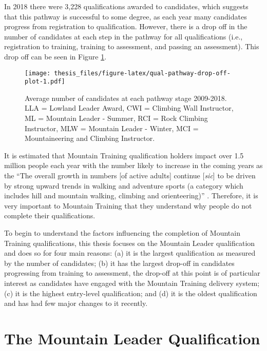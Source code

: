 \documentclass[
  12pt,
  a4paper,
]{book}
\begin{document}
In 2018 there were 3,228 qualifications awarded to candidates, which suggests that this pathway is successful to some degree, as each year many candidates progress from registration to qualification. However, there is a drop off in the number of candidates at each step in the pathway for all qualifications (i.e., registration to training, training to assessment, and passing an assessment). This drop off can be seen in Figure \ref{fig:qual-pathway-drop-off-plot}.

\begin{figure}
\centering
\texttt{[image: thesis\_files/figure-latex/qual-pathway-drop-off-plot-1.pdf]}
\caption{\label{fig:qual-pathway-drop-off-plot}Average number of candidates at each pathway stage 2009-2018. LLA = Lowland Leader Award, CWI = Climbing Wall Instructor, ML = Mountain Leader - Summer, RCI = Rock Climbing Instructor, MLW = Mountain Leader - Winter, MCI = Mountaineering and Climbing Instructor.}
\end{figure}

It is estimated that Mountain Training qualification holders impact over 1.5 million people each year \citep{MTE2019} with the number likely to increase in the coming years as the ``The overall growth in numbers {[}of active adults{]} continue {[}\emph{sic}{]} to be driven by strong upward trends in walking and adventure sports (a category which includes hill and mountain walking, climbing and orienteering)'' \citep[p 14]{SportEngland2020}. Therefore, it is very important to Mountain Training that they understand why people do not complete their qualifications.

To begin to understand the factors influencing the completion of Mountain Training qualifications, this thesis focuses on the Mountain Leader qualification and does so for four main reasons: (a) it is the largest qualification as measured by the number of candidates; (b) it has the largest drop-off in candidates progressing from training to assessment, the drop-off at this point is of particular interest as candidates have engaged with the Mountain Training delivery system; (c) it is the highest entry-level qualification; and (d) it is the oldest qualification and has had few major changes to it recently.

\hypertarget{the-mountain-leader-qualification}{%
\section{The Mountain Leader Qualification}\label{the-mountain-leader-qualification}}
\end{document}
